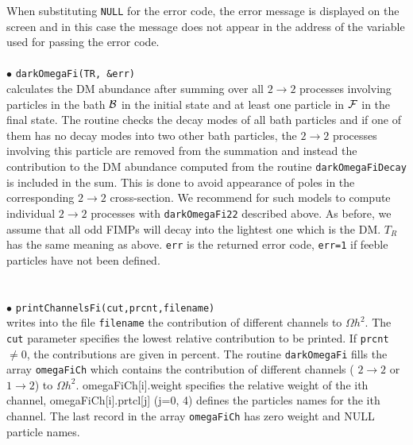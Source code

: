 \documentclass[12pt,a4paper]{article}
\begin{document}
 When substituting \verb|NULL| for the error code, the error message is displayed on the screen and in this case the message does not appear in the address of the variable used for passing the error code.
 \\
 \\

\noindent
$\bullet$ \verb|darkOmegaFi(TR, &err)|  \\
calculates the  DM abundance after summing over all 
$2\to2$ processes involving  particles in the bath ${\cal B}$ in the initial state  and at least one particle in ${\cal F}$  in the final state. The routine checks the decay modes of all bath particles and if one of them has no decay modes into two other bath particles, the $2\to2$ processes involving this particle are removed from the summation and instead the contribution to the DM abundance computed from the routine \verb|darkOmegaFiDecay| is included in the sum.  This is done to avoid appearance of poles in the corresponding $2\to2$ cross-section. We recommend for such models to compute individual $2\to2$ processes with \verb|darkOmegaFi22| described above. As before, we assume that all odd FIMPs will decay into the lightest one which is the DM. $T_R$    has the same meaning as above.
{\tt err} is the returned error code, \verb|err=1| if feeble particles have not been defined. \\
\\
\\
\noindent
$\bullet$ \verb|printChannelsFi(cut,prcnt,filename)|  \\
writes into the file \verb|filename| the contribution of different channels to $\Omega h^2$. The \verb|cut| parameter specifies the lowest relative contribution to be printed.   If
\verb|prcnt| $\neq 0$, the contributions are given in percent.   
The routine \verb|darkOmegaFi| fills  the array      \verb|omegaFiCh| which contains the contribution of different channels ( $2\rightarrow 2$ or $1\rightarrow 2$) to $\Omega h^2$.
omegaFiCh[i].weight specifies the relative weight of the ith channel,
omegaFiCh[i].prtcl[j] (j=0, 4) defines the particles names for the ith channel.
The last record in the array  \verb|omegaFiCh| has zero weight and NULL particle names.
\\
\\
\end{document}
